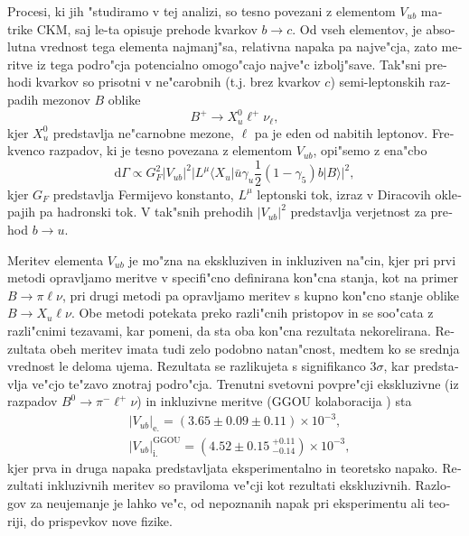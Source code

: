 \documentclass[headings=standardclasses,headings=big,oneside,a4paper,openany,12pt]{scrbook}
\newcommand {\E}[1]{\times 10^{#1}}
\begin{document}
\begin{otherlanguage}{slovene}
Procesi, ki jih "studiramo v tej analizi, so tesno povezani z elementom $V_{ub}$ matrike CKM, saj le-ta opisuje prehode kvarkov $b \to c$. Od vseh elementov, je absolutna vrednost tega elementa najmanj"sa, relativna napaka pa najve"cja, zato meritve iz tega podro"cja potencialno omogo"cajo najve"c izbolj"save. Tak"sni prehodi kvarkov so prisotni v ne"carobnih (t.j. brez kvarkov $c$) semi-leptonskih razpadih mezonov $B$ oblike 
\begin{equation}
B^+ \to X_u^0 \ell^+ \nu_\ell,
\end{equation}
kjer $X_u^0$ predstavlja ne"carnobne mezone, $\ell$ pa je eden od nabitih leptonov. Frekvenco razpadov, ki je tesno povezana z elementom $V_{ub}$, opi"semo z ena"cbo
\begin{equation}
\mathrm{d} \Gamma \propto G_F^2 \vert V_{ub} \vert ^2 \vert L^\mu \langle X_u \vert \bar u \gamma_u \frac{1}{2} (1-\gamma_5) b \vert B \rangle \vert ^2,
\end{equation}
kjer $G_F$ predstavlja Fermijevo konstanto, $L^\mu$ leptonski tok, izraz v Diracovih oklepajih pa hadronski tok. V tak"snih prehodih $\vert V_{ub} \vert ^2$ predstavlja verjetnost za prehod $b \to u$.

Meritev elementa $V_{ub}$ je mo"zna na ekskluziven in inkluziven na"cin, kjer pri prvi metodi opravljamo meritve v specifi"cno definirana kon"cna stanja, kot na primer $B \to \pi \ell \nu$, pri drugi metodi pa opravljamo meritev s kupno kon"cno stanje oblike $B \to X_u \ell \nu$. Obe metodi potekata preko razli"cnih pristopov in se soo"cata z razli"cnimi tezavami, kar pomeni, da sta oba kon"cna rezultata nekorelirana. Rezultata obeh meritev imata tudi zelo podobno natan"cnost, medtem ko se srednja vrednost le deloma ujema. Rezultata se razlikujeta s signifikanco $3\sigma$, kar predstavlja ve"cjo te"zavo znotraj podro"cja. Trenutni svetovni povpre"cji \cite{Amhis:2016xyh} ekskluzivne (iz razpadov $B^0 \to \pi^- \ell^+ \nu$) in inkluzivne meritve (GGOU kolaboracija \cite{Gambino:2007rp}) sta
\begin{align}
&\vert V_{ub} \vert_{\mathrm{e.}} = \left(3.65 \pm 0.09 \pm 0.11\right)\E{-3},\\
&\vert V_{ub} \vert_{\mathrm{i.}}^{\mathrm{GGOU}} = \left(4.52 \pm 0.15~{}^{+0.11}_{-0.14}\right)\E{-3},
\end{align}
kjer prva in druga napaka predstavljata eksperimentalno in teoretsko napako. Rezultati inkluzivnih meritev so praviloma ve"cji kot rezultati ekskluzivnih. Razlogov za neujemanje je lahko ve"c, od nepoznanih napak pri eksperimentu ali teoriji, do prispevkov nove fizike.


\end{otherlanguage}
\end{document}
